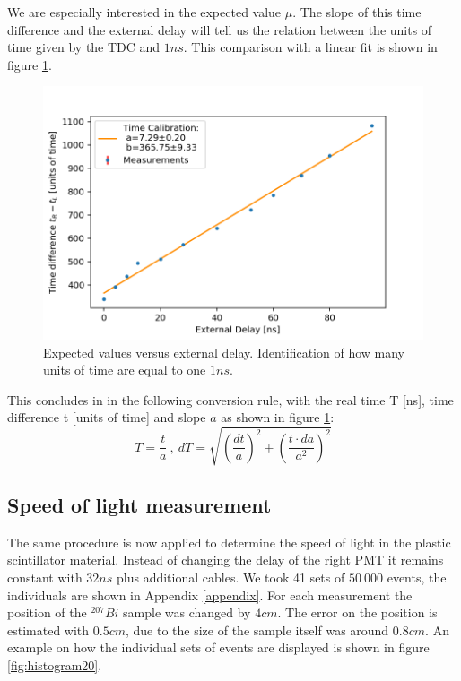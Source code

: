 \documentclass[]{article}
\begin{document}
We are especially interested in the expected value $\mu$. The slope of this time difference and the external delay will tell us the relation between the units of time given by the TDC and $1ns$. This comparison with a linear fit is shown in figure \ref{fig:TimeCalibration}.

\begin{figure}[H]
\centering
\includegraphics[width=1\textwidth]{Plots/TimeCalibration.png}
\caption{Expected values versus external delay. Identification of how many units of time are equal to one $1ns$. }
\label{fig:TimeCalibration}
\end{figure}

This concludes in in the following conversion rule, with the real time T [ns], time difference t [units of time] and slope $a$ as shown in figure \ref{fig:TimeCalibration}:
\begin{equation}
T = \frac{t}{a}\:,\: dT=\sqrt{\left(\frac{dt}{a}\right)^2 + \left(\frac{t\cdot da}{a^2}\right)^2}
\end{equation}


\subsection{Speed of light measurement}\label{c determination}
The same procedure is now applied to determine the speed of light in the plastic scintillator material. Instead of changing the delay of the right PMT it remains constant with $32ns$ plus additional cables. We took 41 sets of $50\ 000$ events, the individuals are shown in Appendix \ref{appendix}. For each measurement the position of the $^{207} Bi$ sample was changed by $4cm$. The error on the position is estimated with $0.5cm$, due to the size of the sample itself was around $0.8cm$. An example on how the individual sets of events are displayed is shown in figure \ref{fig:histogram20}.
\end{document}
